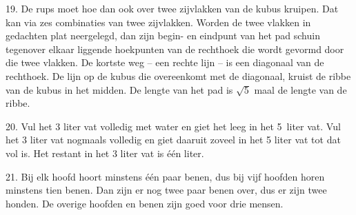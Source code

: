 \clearpage

\begin{problem}{19.}
    De rups moet hoe dan ook over twee zijvlakken van de kubus kruipen. Dat kan via zes combinaties van twee zijvlakken. Worden de twee vlakken in gedachten plat neergelegd, dan zijn begin- en eindpunt van het pad schuin tegenover elkaar liggende hoekpunten van de rechthoek die wordt gevormd door die twee vlakken. De kortste weg -- een rechte lijn -- is een diagonaal van de rechthoek. De lijn op de kubus die overeenkomt met de diagonaal, kruist de ribbe van de kubus in het midden. De lengte van het pad is $\sqrt{5}$ maal de lengte van de ribbe.
\end{problem}

\begin{problem}{20.}
    Vul het 3 liter vat volledig met water en giet het leeg in het 5~liter vat. Vul het 3 liter vat nogmaals volledig en giet daaruit zoveel in het 5 liter vat tot dat vol is. Het restant in het 3 liter vat is één liter.
\end{problem}

\begin{problem}{21.}
    Bij elk hoofd hoort minstens één paar benen, dus bij vijf hoofden horen minstens tien benen. Dan zijn er nog twee paar benen over, dus er zijn twee honden. De overige hoofden en benen zijn goed voor drie mensen.
\end{problem}

